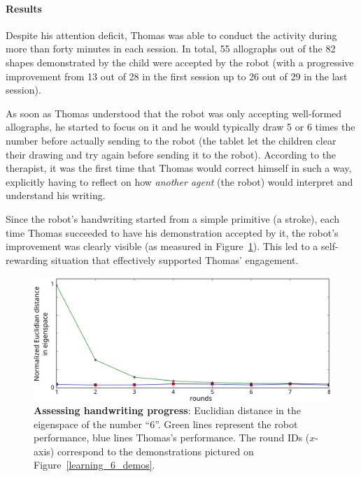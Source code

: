 \documentclass{article}
\begin{document}
%

\paragraph{Results}

Despite his attention deficit, Thomas was able to conduct the activity during
more than forty minutes in each session. In total, 55 allographs out of the 82
shapes demonstrated by the child were accepted by the robot (with a progressive
improvement from 13 out of 28 in the first session up to 26 out of 29 in the
last session).

As soon as Thomas understood that the robot was only accepting well-formed
allographs, he started to focus on it and he would typically draw 5 or 6 times
the number before actually sending to the robot (the tablet let the children
clear their drawing and try again before sending it to the robot). According to
the therapist, it was the first time that Thomas would correct himself in such a
way, explicitly having to reflect on how \emph{another agent} (the robot) would
interpret and understand his writing.

Since the robot's handwriting started from a simple primitive (a stroke), each
time Thomas succeeded to have his demonstration accepted by it, the robot's
improvement was clearly visible (as measured in Figure~\ref{henry_distances}).
This led to a self-rewarding situation that effectively supported Thomas'
engagement.

\begin{figure}
    \centering
    \includegraphics[width=0.9\linewidth]{learning_6_distances}
    \caption{\small \textbf{Assessing handwriting progress}: Euclidian
    distance in the eigenspace of the number ``6''. Green lines represent the robot performance,
    blue lines Thomas's performance. The round IDs ($x$-axis) correspond to the demonstrations
pictured on Figure~\ref{learning_6_demos}.}
    \label{henry_distances}
\end{figure}
\end{document}
